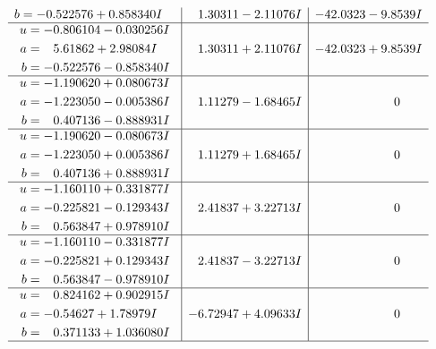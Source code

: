 \documentclass[1p]{elsarticle_modified}
\theoremstyle{definition}
\begin{document}
$$\begin{array}{c|c|c}
\begin{aligned}
b &= -0.522576 + 0.858340 I\end{aligned}
 & \phantom{-}1.30311 - 2.11076 I & -42.0323 - 9.8539 I \\ \hline\begin{aligned}
u &= -0.806104 - 0.030256 I \\
a &= \phantom{-}5.61862 + 2.98084 I \\
b &= -0.522576 - 0.858340 I\end{aligned}
 & \phantom{-}1.30311 + 2.11076 I & -42.0323 + 9.8539 I \\ \hline\begin{aligned}
u &= -1.190620 + 0.080673 I \\
a &= -1.223050 - 0.005386 I \\
b &= \phantom{-}0.407136 - 0.888931 I\end{aligned}
 & \phantom{-}1.11279 - 1.68465 I & \phantom{-0.000000 } 0 \\ \hline\begin{aligned}
u &= -1.190620 - 0.080673 I \\
a &= -1.223050 + 0.005386 I \\
b &= \phantom{-}0.407136 + 0.888931 I\end{aligned}
 & \phantom{-}1.11279 + 1.68465 I & \phantom{-0.000000 } 0 \\ \hline\begin{aligned}
u &= -1.160110 + 0.331877 I \\
a &= -0.225821 - 0.129343 I \\
b &= \phantom{-}0.563847 + 0.978910 I\end{aligned}
 & \phantom{-}2.41837 + 3.22713 I & \phantom{-0.000000 } 0 \\ \hline\begin{aligned}
u &= -1.160110 - 0.331877 I \\
a &= -0.225821 + 0.129343 I \\
b &= \phantom{-}0.563847 - 0.978910 I\end{aligned}
 & \phantom{-}2.41837 - 3.22713 I & \phantom{-0.000000 } 0 \\ \hline\begin{aligned}
u &= \phantom{-}0.824162 + 0.902915 I \\
a &= -0.54627 + 1.78979 I \\
b &= \phantom{-}0.371133 + 1.036080 I\end{aligned}
 & -6.72947 + 4.09633 I & \phantom{-0.000000 } 0\\
 \hline 
 \end{array}$$\newpage$$\begin{array}{c|c|c}  

\end{array}$$
\end{document}
